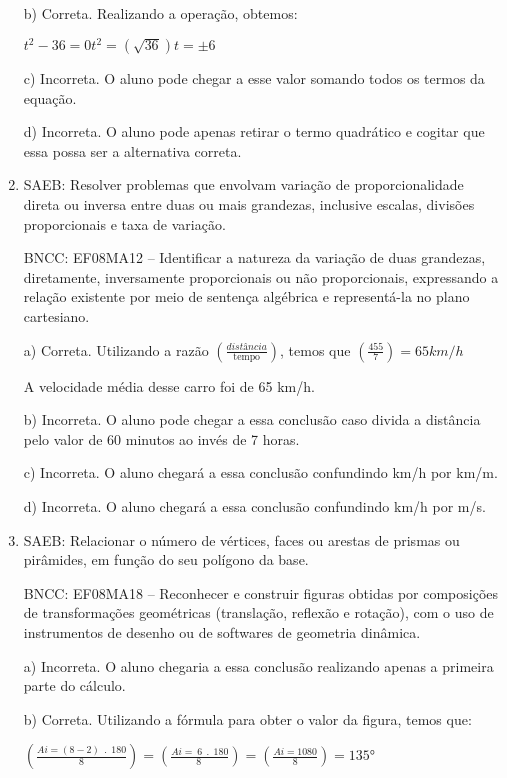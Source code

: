 \begin{enumerate}
b) Correta. Realizando a operação, obtemos:

$t^2 - 36 = 0

t^2 = (\sqrt{36})

t = ± 6$

c) Incorreta. O aluno pode chegar a esse valor somando todos os
termos da equação.

d) Incorreta. O aluno pode apenas retirar o termo quadrático e
cogitar que essa possa ser a alternativa correta.

\item SAEB: Resolver problemas que envolvam variação de proporcionalidade
direta ou inversa entre duas ou mais grandezas, inclusive escalas,
divisões proporcionais e taxa de variação.

BNCC: EF08MA12 -- Identificar a natureza da variação de duas grandezas,
diretamente, inversamente proporcionais ou não proporcionais,
expressando a relação existente por meio de sentença algébrica e
representá-la no plano cartesiano.

a) Correta. Utilizando a razão $(\frac{distância}{\text{tempo}})$,
temos que $(\frac{455}{7}) = 65km/h$

A velocidade média desse carro foi de 65 km/h.

b) Incorreta. O aluno pode chegar a essa conclusão caso divida a
distância pelo valor de 60 minutos ao invés de 7 horas.

c) Incorreta. O aluno chegará a essa conclusão confundindo km/h por
km/m.

d) Incorreta. O aluno chegará a essa conclusão confundindo km/h por
m/s.

\item SAEB: Relacionar o número de vértices, faces ou arestas de prismas ou
pirâmides, em função do seu polígono da base.

BNCC: EF08MA18 -- Reconhecer e construir figuras obtidas por composições
de transformações geométricas (translação, reflexão e rotação), com o
uso de instrumentos de desenho ou de softwares de geometria dinâmica.

a) Incorreta. O aluno chegaria a essa conclusão realizando apenas a
primeira parte do cálculo.

b) Correta. Utilizando a fórmula para obter o valor da figura,
temos que:

$(\frac{Ai = \left( 8 - 2 \right)\ \ .\ \ 180}{8}) =

(\frac{Ai = \ 6\ \ .\ \ 180}{8\ }) =

(\frac{Ai = 1080}{8}) = 135°$


\end{enumerate}
